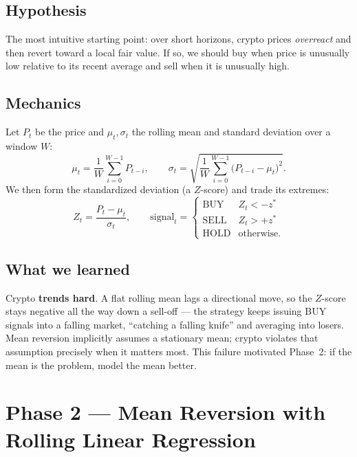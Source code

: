 \documentclass[11pt,a4paper]{article}
\begin{document}
\subsection{Hypothesis}
The most intuitive starting point: over short horizons, crypto prices
\emph{overreact} and then revert toward a local fair value. If so, we should buy
when price is unusually low relative to its recent average and sell when it is
unusually high.

\subsection{Mechanics}
Let $P_t$ be the price and $\mu_t,\sigma_t$ the rolling mean and standard
deviation over a window $W$:
\begin{equation}
  \mu_t = \frac{1}{W}\sum_{i=0}^{W-1} P_{t-i}, \qquad
  \sigma_t = \sqrt{\frac{1}{W}\sum_{i=0}^{W-1}\bigl(P_{t-i}-\mu_t\bigr)^2}.
\end{equation}
We then form the standardized deviation (a $Z$-score) and trade its extremes:
\begin{equation}
  Z_t = \frac{P_t - \mu_t}{\sigma_t},\qquad
  \text{signal}_t =
  \begin{cases}
    \text{BUY}  & Z_t < -z^{*}\\
    \text{SELL} & Z_t > +z^{*}\\
    \text{HOLD} & \text{otherwise.}
  \end{cases}
\end{equation}

\subsection{What we learned}
Crypto \textbf{trends hard}. A flat rolling mean lags a directional move, so the
$Z$-score stays negative all the way down a sell-off --- the strategy keeps issuing
BUY signals into a falling market, ``catching a falling knife'' and averaging into
losers. Mean reversion implicitly assumes a stationary mean; crypto violates that
assumption precisely when it matters most. This failure motivated Phase~2: if the
mean is the problem, model the mean better.

\section{Phase 2 --- Mean Reversion with Rolling Linear Regression}
\end{document}
